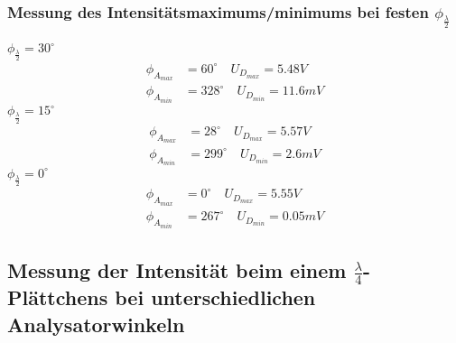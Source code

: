 \documentclass[a4paper]{article}
\begin{document}
\subsubsection{Messung des Intensitätsmaximums/minimums bei festen $\phi_{\frac{\lambda}{2}}$}
$\phi_{\frac{\lambda}{2}}= 30^\circ$
\begin{align}
  \phi_{A_{max}}&=60^\circ \quad U_{D_{max}}=5.48V  \\
  \phi_{A_{min}}&=328^\circ \quad U_{D_{min}}=11.6mV  
\end{align}
$\phi_{\frac{\lambda}{2}}= 15^\circ$
\begin{align}
  \phi_{A_{max}}&=28^\circ \quad U_{D_{max}}=5.57V \\ 
  \phi_{A_{min}}&=299^\circ \quad U_{D_{min}}=2.6mV  
\end{align}
$\phi_{\frac{\lambda}{2}}= 0^\circ$
\begin{align}
  \phi_{A_{max}}&=0^\circ \quad U_{D_{max}}=5.55V  \\
  \phi_{A_{min}}&=267^\circ \quad U_{D_{min}}=0.05mV  
\end{align}
\newpage

\subsection{Messung der Intensität beim einem $\frac{\lambda}{4}$-Plättchens bei unterschiedlichen Analysatorwinkeln}
\end{document}
